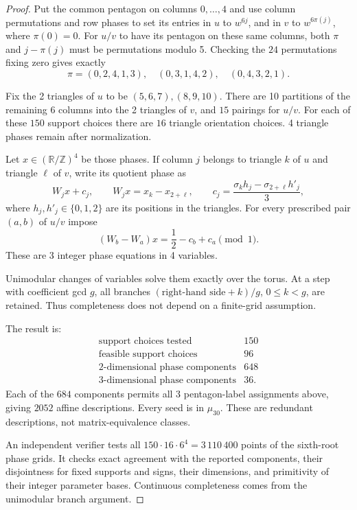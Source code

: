 \documentclass[11pt,a4paper]{article}
\theoremstyle{plain}
\theoremstyle{definition}
\theoremstyle{plain}
\begin{document}
\begin{proof}
Put the common pentagon on columns $0,\ldots,4$ and use column permutations and row phases to set its entries in $u$ to $w^{6j}$, and in $v$ to $w^{6\pi(j)}$, where $\pi(0)=0$. For $u/v$ to have its pentagon on these same columns, both $\pi$ and $j-\pi(j)$ must be permutations modulo 5. Checking the $24$ permutations fixing zero gives exactly
$$\pi=(0,2,4,1,3),\quad(0,3,1,4,2),\quad(0,4,3,2,1).$$

Fix the 2 triangles of $u$ to be $(5,6,7),(8,9,10)$. There are 10 partitions of the remaining 6 columns into the 2 triangles of $v$, and $15$ pairings for $u/v$. For each of these $150$ support choices there are $16$ triangle orientation choices. 4 triangle phases remain after normalization.

Let $x\in(\mathbb R/\mathbb Z)^4$ be those phases. If column $j$ belongs to triangle $k$ of $u$ and triangle $\ell$ of $v$, write its quotient phase as
$$W_jx+c_j,\qquad W_jx=x_k-x_{2+\ell},\qquad c_j=\frac{\sigma_k h_j-\sigma_{2+\ell}h'_j}{3},$$
where $h_j,h'_j\in\{0,1,2\}$ are its positions in the triangles. For every prescribed pair $(a,b)$ of $u/v$ impose
$$(W_b-W_a)x=\frac12-c_b+c_a\pmod1.$$
These are 3 integer phase equations in 4 variables.

Unimodular changes of variables solve them exactly over the torus. At a step with coefficient gcd $g$, all branches $(\text{right-hand side}+k)/g$, $0\leq k<g$, are retained. Thus completeness does not depend on a finite-grid assumption.

The result is:
$$\begin{array}{l|r}
\text{support choices tested}&150\\
\text{feasible support choices}&96\\
\text{2-dimensional phase components}&648\\
\text{3-dimensional phase components}&36.
\end{array}$$
Each of the $684$ components permits all 3 pentagon-label assignments above, giving $2052$ affine descriptions. Every seed is in $\mu_{30}$. These are redundant descriptions, not matrix-equivalence classes.

An independent verifier tests all $150\cdot16\cdot6^4=3\,110\,400$ points of the sixth-root phase grids. It checks exact agreement with the reported components, their disjointness for fixed supports and signs, their dimensions, and primitivity of their integer parameter bases. Continuous completeness comes from the unimodular branch argument.
\end{proof}
\end{document}
